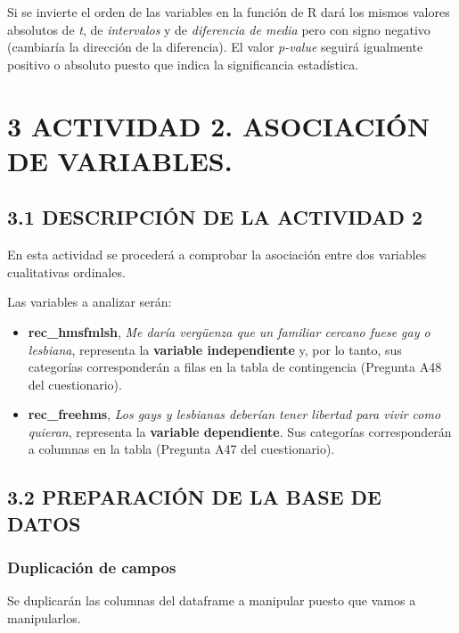 \documentclass[
  12 pt,
  a4paper,
]{article}
\begin{document}
Si se invierte el orden de las variables en la función de R dará los
mismos valores absolutos de \emph{t}, de \emph{intervalos} y de
\emph{diferencia de media} pero con signo negativo (cambiaría la
dirección de la diferencia). El valor \emph{p-value} seguirá igualmente
positivo o absoluto puesto que indica la significancia estadística.

\newpage

\section{3 ACTIVIDAD 2. ASOCIACIÓN DE
VARIABLES.}\label{actividad-2.-asociaciuxf3n-de-variables.}

\subsection{3.1 DESCRIPCIÓN DE LA ACTIVIDAD
2}\label{descripciuxf3n-de-la-actividad-2}

En esta actividad se procederá a comprobar la asociación entre dos
variables cualitativas ordinales.

Las variables a analizar serán:

\begin{itemize}
\item
  \textbf{rec\_hmsfmlsh}, \emph{Me daría vergüenza que un familiar
  cercano fuese gay o lesbiana}, representa la \textbf{variable
  independiente} y, por lo tanto, sus categorías corresponderán a filas
  en la tabla de contingencia (Pregunta A48 del cuestionario).
\item
  \textbf{rec\_freehms}, \emph{Los gays y lesbianas deberían tener
  libertad para vivir como quieran}, representa la \textbf{variable
  dependiente}. Sus categorías corresponderán a columnas en la tabla
  (Pregunta A47 del cuestionario).
\end{itemize}

\subsection{3.2 PREPARACIÓN DE LA BASE DE
DATOS}\label{preparaciuxf3n-de-la-base-de-datos-1}

\subsubsection{Duplicación de campos}\label{duplicaciuxf3n-de-campos}

Se duplicarán las columnas del dataframe a manipular puesto que vamos a
manipularlos.
\end{document}
